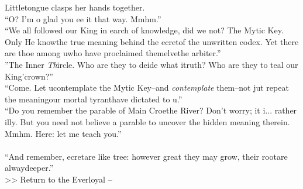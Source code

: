 Littletongue clasps her hands together.\\
“O? I’m \lisp o glad you \lisp ee it that way. Mmhm.”\\

“We all followed our King in \lisp earch of knowledge, did we not? The My\lisp tic Key\lisp. Only He know\lispx the true meaning behind the \lisp ecret\lispx of the unwritten codex. Yet there are tho\lisp e among u\lispx who have proclaimed them\lisp elve\lispx the arbiter\lisp .”\\

”The Inner \emph{Th}ircle. Who are they to de\lisp ide what i\lispx truth? Who are they to \lisp teal our King’\lispx crown?” \\

“Come. Let u\lispx contemplate the My\lisp tic Key\lisp --and \emph{contemplate} them--not ju\lisp t repeat the meaning\lispx our mortal tyrant\lispx have dictated to u\lisp .” \\

“Do you remember the parable of Ma\lisp in Cro\lisp e\lispx the River? Don’t worry; it i\lisp ... rather \lisp illy. But you need not believe a parable to uncover the hidden meaning therein. Mmhm. Here: let me teach you.”\\
\\

“And remember, \lisp ecret\lispx are like tree\lisp : however great they may grow, their root\lispx are alway\lispx deeper.”\\

>>  Return to the Everloyal -- 